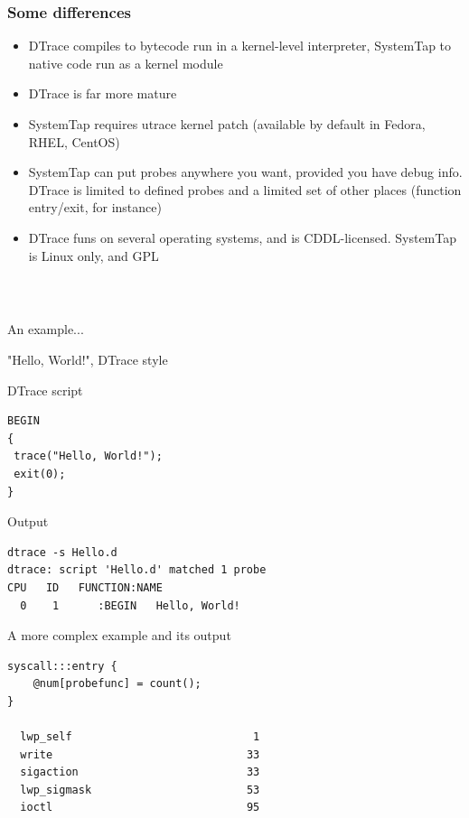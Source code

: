 \documentclass{beamer}
\begin{document}
\begin{frame}
     \frametitle{Some differences}
     \begin{itemize}
         \item DTrace compiles to bytecode run in a kernel-level interpreter, SystemTap to native code run as a kernel module
         \item DTrace is far more mature
         \item SystemTap requires utrace kernel patch (available by default in Fedora, RHEL, CentOS)
         \item SystemTap can put probes anywhere you want, provided you have debug info. DTrace is limited to defined probes and a limited set of other places (function entry/exit, for instance)
         \item DTrace funs on several operating systems, and is CDDL-licensed. SystemTap is Linux only, and GPL
     \end{itemize}
\end{frame}

\begin{frame}
    \frametitle{~}
    \begin{center}
    An example...
    \end{center}
\end{frame}

\begin{frame}[fragile]
    "Hello, World!", DTrace style
    \begin{exampleblock}{DTrace script}
    \begin{lstlisting}
BEGIN 
{ 
 trace("Hello, World!"); 
 exit(0); 
}
    \end{lstlisting}
    \end{exampleblock}

    \begin{exampleblock}{Output}
    \begin{verbatim}
dtrace -s Hello.d 
dtrace: script 'Hello.d' matched 1 probe
CPU   ID   FUNCTION:NAME
  0    1      :BEGIN   Hello, World!
    \end{verbatim}
    \end{exampleblock}
\end{frame}

\begin{frame}[fragile]
    \begin{exampleblock}{A more complex example and its output}
    \begin{lstlisting}
syscall:::entry {
    @num[probefunc] = count();
}

  lwp_self                            1
  write                              33
  sigaction                          33
  lwp_sigmask                        53
  ioctl                              95
    \end{lstlisting}
    \end{exampleblock}
\end{frame}
\end{document}

